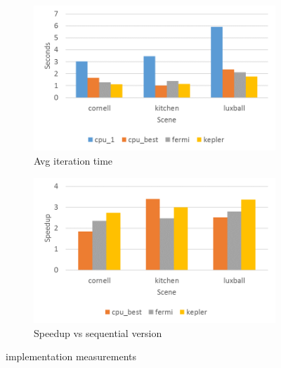 \documentclass[main.tex]{subfiles}
\begin{document}
\begin{figure}[!htp]
  \centering
  \begin{subfigure}{.5\textwidth}
    \centering
    \includegraphics[width=\linewidth]{profiling/gpu_time}
    \caption{Avg iteration time} \label{fig:prof:cuda_time}
  \end{subfigure}%
  \begin{subfigure}{.5\textwidth}
    \centering
    \includegraphics[width=\linewidth]{profiling/gpu_speedup}
    \caption{Speedup vs sequential version} \label{fig:prof:cuda_speedup}
  \end{subfigure}
  \caption{\gpu implementation measurements} \label{fig:prof:cuda}
\end{figure}
\end{document}
